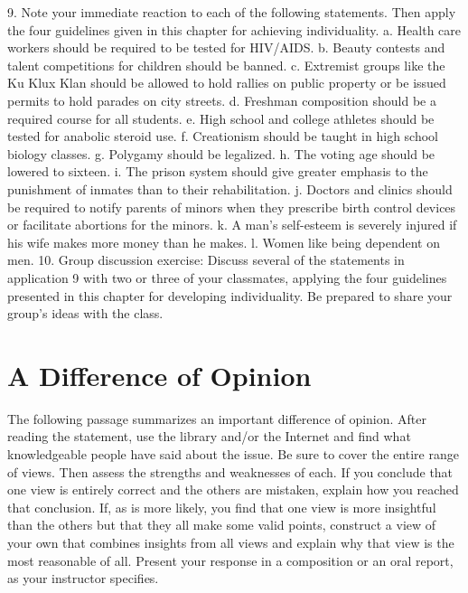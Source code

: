 \documentclass{book}
\begin{document}
9. Note your immediate reaction to each of the following statements. Then apply the four guidelines given in this chapter for achieving individuality.
    a. Health care workers should be required to be tested for HIV/AIDS.
    b. Beauty contests and talent competitions for children should be banned.
    c. Extremist groups like the Ku Klux Klan should be allowed to hold rallies on public property or be issued permits to hold parades on city streets.
    d. Freshman composition should be a required course for all students.
    e. High school and college athletes should be tested for anabolic steroid use.
    f. Creationism should be taught in high school biology classes.
    g. Polygamy should be legalized.
    h. The voting age should be lowered to sixteen.
    i. The prison system should give greater emphasis to the punishment of inmates than to their rehabilitation.
    j. Doctors and clinics should be required to notify parents of minors when they prescribe birth control devices or facilitate abortions for the minors.
    k. A man’s self-esteem is severely injured if his wife makes more money than he makes.
    l. Women like being dependent on men.
10. Group discussion exercise: Discuss several of the statements in application 9 with two or three of your classmates, applying the four guidelines presented in this chapter for developing individuality. Be prepared to share your group’s ideas with the class.

\section{A Difference of Opinion}

The following passage summarizes an important difference of opinion. After reading the statement, use the library and/or the Internet and find what knowledgeable people have said about the issue. Be sure to cover the entire range of views. Then assess the strengths and weaknesses of each. If you conclude that one view is entirely correct and the others are mistaken, explain how you reached that conclusion. If, as is more likely, you find that one view is more insightful than the others but that they all make some valid points, construct a view of your own that combines insights from all views and explain why that view is the most reasonable of all. Present your response in a composition or an oral report, as your instructor specifies.
\end{document}
